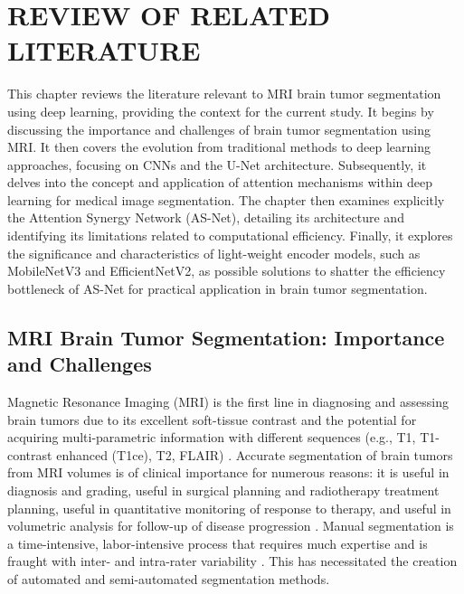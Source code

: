 \chapter{REVIEW OF RELATED LITERATURE}

This chapter reviews the literature relevant to MRI brain tumor segmentation using deep learning, providing the context for the current study. It begins by discussing the importance and challenges of brain tumor segmentation using MRI. It then covers the evolution from traditional methods to deep learning approaches, focusing on CNNs and the U-Net architecture. Subsequently, it delves into the concept and application of attention mechanisms within deep learning for medical image segmentation. The chapter then examines explicitly the Attention Synergy Network (AS-Net), detailing its architecture and identifying its limitations related to computational efficiency. Finally, it explores the significance and characteristics of light-weight encoder models, such as MobileNetV3 and EfficientNetV2, as possible solutions to shatter the efficiency bottleneck of AS-Net for practical application in brain tumor segmentation.

\section{MRI Brain Tumor Segmentation: Importance and Challenges}

Magnetic Resonance Imaging (MRI) is the first line in diagnosing and assessing brain tumors due to its excellent soft-tissue contrast and the potential for acquiring multi-parametric information with different sequences (e.g., T1, T1-contrast enhanced (T1ce), T2, FLAIR) \parencite{gordillo2013state}. Accurate segmentation of brain tumors from MRI volumes is of clinical importance for numerous reasons: it is useful in diagnosis and grading, useful in surgical planning and radiotherapy treatment planning, useful in quantitative monitoring of response to therapy, and useful in volumetric analysis for follow-up of disease progression \parencite{cai2018quantitative, bakas2018identifying, tang2019role}. Manual segmentation is a time-intensive, labor-intensive process that requires much expertise and is fraught with inter- and intra-rater variability \parencite{bakas2018identifying}. This has necessitated the creation of automated and semi-automated segmentation methods.

